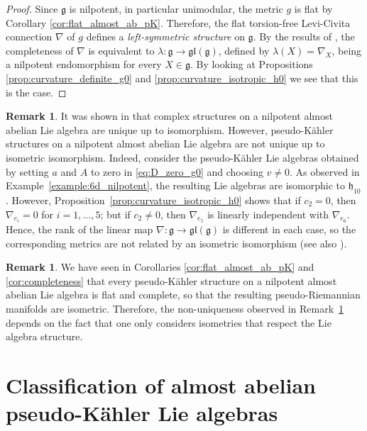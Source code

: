 \documentclass{article}
\theoremstyle{definition}
\newtheorem{remark}[theorem]{Remark}
\newcommand{\frg}{\mathfrak{g}}
\newcommand{\frh}{\mathfrak{h}}
\begin{document}
\begin{proof}
    Since $\frg$ is nilpotent, in particular unimodular, the metric $g$ is flat by Corollary \ref{cor:flat_almost_ab_pK}. Therefore, the flat torsion-free Levi-Civita connection $\nabla$ of $g$ defines a \emph{left-symmetric structure} on $\frg$. By the results of \cite{Segal92}, the completeness of $\nabla$ is equivalent to $\lambda\colon\frg\to\mathfrak{gl}(\frg)$, defined by $\lambda(X)=\nabla_X$, being a nilpotent endomorphism for every $X\in\frg$. By looking at Propositions \ref{prop:curvature_definite_g0} and \ref{prop:curvature_isotropic_h0} we see that this is the case.
\end{proof}

\begin{remark}\label{remark:nonuniqueness}
    It was shown in \cite{AABRW25} that complex structures on a nilpotent almost abelian Lie algebra are unique up to isomorphism. However, pseudo-Kähler structures on a nilpotent almost abelian Lie algebra are not unique up to isometric isomorphism. Indeed, consider the pseudo-K\"ahler Lie algebras obtained by setting $a$ and $A$ to zero in \eqref{eq:D_zero_g0} and choosing $v\neq0$. As observed in Example~\ref{example:6d_nilpotent}, the resulting Lie algebras are isomorphic to $\frh_{10}$. However, Proposition~\ref{prop:curvature_isotropic_h0} shows that if $c_2=0$, then $\nabla_{e_i}=0$ for $i=1,\ldots,5$; but if $c_2\neq0$, then $\nabla_{e_5}$ is linearly independent with $\nabla_{e_6}$. Hence, the rank of the linear map $\nabla\colon\frg\to\mathfrak{gl}(\frg)$ is different in each case, so the corresponding metrics are not related by an isometric isomorphism (see also \cite[Proposition 3.9]{CFU04}).
\end{remark}

\begin{remark}\label{remark:uniquenessuptoisometries}
    We have seen in Corollaries \ref{cor:flat_almost_ab_pK} and \ref{cor:completeness} that every pseudo-Kähler structure on a nilpotent almost abelian Lie algebra is flat and complete, so that the resulting pseudo-Riemannian manifolds are isometric. Therefore, the non-uniqueness observed in Remark~\ref{remark:nonuniqueness} depends on the fact that one only considers isometries that respect the Lie algebra structure.
\end{remark}


\section{Classification of almost abelian pseudo-Kähler Lie algebras}\label{section:classification}
\end{document}
